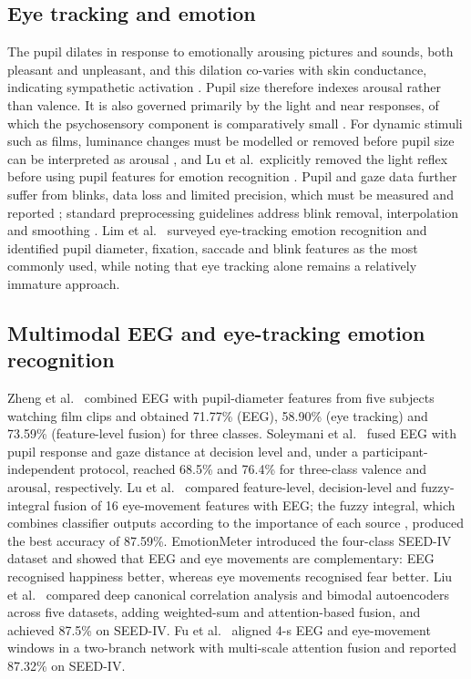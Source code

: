 \subsection{Eye tracking and emotion}
The pupil dilates in response to emotionally arousing pictures and sounds, both pleasant and unpleasant, and this dilation co-varies with skin conductance, indicating sympathetic activation \cite{Bradley2008,Partala2003}. Pupil size therefore indexes arousal rather than valence. It is also governed primarily by the light and near responses, of which the psychosensory component is comparatively small \cite{Mathot2018}. For dynamic stimuli such as films, luminance changes must be modelled or removed before pupil size can be interpreted as arousal \cite{Raiturkar2016}, and Lu et al.\ explicitly removed the light reflex before using pupil features for emotion recognition \cite{Lu2015}. Pupil and gaze data further suffer from blinks, data loss and limited precision, which must be measured and reported \cite{Holmqvist2012}; standard preprocessing guidelines address blink removal, interpolation and smoothing \cite{Kret2019}. Lim et al.\ \cite{Lim2020} surveyed eye-tracking emotion recognition and identified pupil diameter, fixation, saccade and blink features as the most commonly used, while noting that eye tracking alone remains a relatively immature approach.

\subsection{Multimodal EEG and eye-tracking emotion recognition}
Zheng et al.\ \cite{ZhengDong2014} combined EEG with pupil-diameter features from five subjects watching film clips and obtained 71.77\% (EEG), 58.90\% (eye tracking) and 73.59\% (feature-level fusion) for three classes. Soleymani et al.\ \cite{Soleymani2012mm} fused EEG with pupil response and gaze distance at decision level and, under a participant-independent protocol, reached 68.5\% and 76.4\% for three-class valence and arousal, respectively. Lu et al.\ \cite{Lu2015} compared feature-level, decision-level and fuzzy-integral fusion of 16 eye-movement features with EEG; the fuzzy integral, which combines classifier outputs according to the importance of each source \cite{ChoKim1995}, produced the best accuracy of 87.59\%. EmotionMeter \cite{Zheng2019} introduced the four-class SEED-IV dataset and showed that EEG and eye movements are complementary: EEG recognised happiness better, whereas eye movements recognised fear better. Liu et al.\ \cite{Liu2022} compared deep canonical correlation analysis and bimodal autoencoders across five datasets, adding weighted-sum and attention-based fusion, and achieved 87.5\% on SEED-IV. Fu et al.\ \cite{Fu2023} aligned 4-s EEG and eye-movement windows in a two-branch network with multi-scale attention fusion and reported 87.32\% on SEED-IV.

